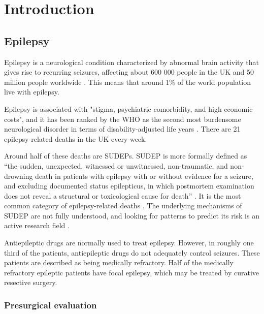 \chapter{Introduction}
\label{chap:intro}
\minitoc


\section{Epilepsy}

Epilepsy is a neurological condition characterized by abnormal brain activity that gives rise to recurring seizures, affecting about 600 000 people in the UK and 50 million people worldwide \cite{nice_epilepsies_2012,fiest_prevalence_2017}.
This means that around 1\% of the world population live with epilepsy.

Epilepsy is associated with "stigma, psychiatric comorbidity, and high economic costs", and it has been ranked by the \ac{WHO} as the second most burdensome neurological disorder in terms of disability-adjusted life years \cite{fiest_prevalence_2017}.
There are 21 epilepsy-related deaths in the UK every week.

Around half of these deaths are \acp{SUDEP}.  %
\ac{SUDEP} is more formally defined as ``the sudden, unexpected, witnessed or unwitnessed, non-traumatic, and non-drowning death in patients with epilepsy with or without evidence for a seizure, and excluding documented status epilepticus, in which postmortem examination does not reveal a structural or toxicological cause for death'' \cite{nashef_sudden_1997}.
It is the most common category of epilepsy-related deaths \cite{devinsky_sudden_2016}.
The underlying mechanisms of \ac{SUDEP} are not fully understood, and looking for patterns to predict its risk is an active research field \cite{so_what_2008,alexandre_risk_2015,vilella_association_2021,jha_sudden_2021}.

Antiepileptic drugs are normally used to treat epilepsy.
However, in roughly one third of the patients, antiepileptic drugs do not adequately control seizures.
These patients are described as being medically refractory.
Half of the medically refractory epileptic patients have focal epilepsy, which may be treated by curative resective surgery.



\subsection{Presurgical evaluation}

